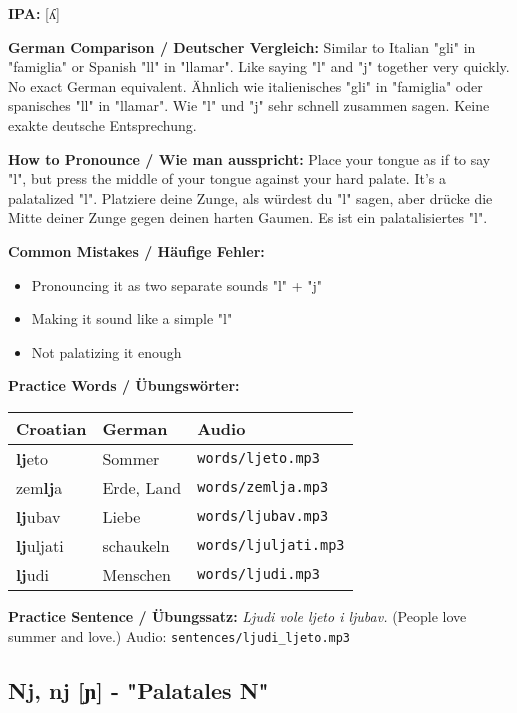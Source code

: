 \begin{tcolorbox}[colback=lightgreen!30, colframe=green!60!black, title=\textbf{Lj, lj}]

\textbf{IPA:} [ʎ]

\textbf{German Comparison / Deutscher Vergleich:}
Similar to Italian "gli" in "famiglia" or Spanish "ll" in "llamar". Like saying "l" and "j" together very quickly. No exact German equivalent.
Ähnlich wie italienisches "gli" in "famiglia" oder spanisches "ll" in "llamar". Wie "l" und "j" sehr schnell zusammen sagen. Keine exakte deutsche Entsprechung.

\textbf{How to Pronounce / Wie man ausspricht:}
Place your tongue as if to say "l", but press the middle of your tongue against your hard palate. It's a palatalized "l".
Platziere deine Zunge, als würdest du "l" sagen, aber drücke die Mitte deiner Zunge gegen deinen harten Gaumen. Es ist ein palatalisiertes "l".

\textbf{Common Mistakes / Häufige Fehler:}
\begin{itemize}
    \item Pronouncing it as two separate sounds "l" + "j"
    \item Making it sound like a simple "l"
    \item Not palatizing it enough
\end{itemize}

\textbf{Practice Words / Übungswörter:}
\begin{tabular}{lll}
\textbf{Croatian} & \textbf{German} & \textbf{Audio} \\
\midrule
\textbf{lj}eto & Sommer & \texttt{words/ljeto.mp3} \\
zem\textbf{lj}a & Erde, Land & \texttt{words/zemlja.mp3} \\
\textbf{lj}ubav & Liebe & \texttt{words/ljubav.mp3} \\
\textbf{lj}uljati & schaukeln & \texttt{words/ljuljati.mp3} \\
\textbf{lj}udi & Menschen & \texttt{words/ljudi.mp3} \\
\end{tabular}

\textbf{Practice Sentence / Übungssatz:}
\textit{Ljudi vole ljeto i ljubav.}
(People love summer and love.)
Audio: \texttt{sentences/ljudi\_ljeto.mp3}

\end{tcolorbox}

\subsection{Nj, nj [ɲ] - "Palatales N"}

